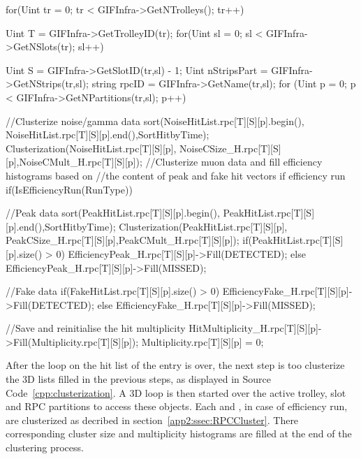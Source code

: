 	\begin{code}
	\begin{cppcode}
for(Uint tr = 0; tr < GIFInfra->GetNTrolleys(); tr++){
    Uint T = GIFInfra->GetTrolleyID(tr);
    for(Uint sl = 0; sl < GIFInfra->GetNSlots(tr); sl++){
        Uint S = GIFInfra->GetSlotID(tr,sl) - 1;
        Uint  nStripsPart   = GIFInfra->GetNStrips(tr,sl);
        string rpcID = GIFInfra->GetName(tr,sl);
        for (Uint p = 0; p < GIFInfra->GetNPartitions(tr,sl); p++){
            //Clusterize noise/gamma data
            sort(NoiseHitList.rpc[T][S][p].begin(),
                 NoiseHitList.rpc[T][S][p].end(),SortHitbyTime);
            Clusterization(NoiseHitList.rpc[T][S][p],
                         NoiseCSize_H.rpc[T][S][p],NoiseCMult_H.rpc[T][S][p]);
            //Clusterize muon data and fill efficiency histograms based on
            //the content of peak and fake hit vectors if efficiency run
            if(IsEfficiencyRun(RunType)){
                //Peak data
                sort(PeakHitList.rpc[T][S][p].begin(),
                     PeakHitList.rpc[T][S][p].end(),SortHitbyTime);
                Clusterization(PeakHitList.rpc[T][S][p],
                           PeakCSize_H.rpc[T][S][p],PeakCMult_H.rpc[T][S][p]);
                if(PeakHitList.rpc[T][S][p].size() > 0)
                    EfficiencyPeak_H.rpc[T][S][p]->Fill(DETECTED);
                else EfficiencyPeak_H.rpc[T][S][p]->Fill(MISSED);

                //Fake data
                if(FakeHitList.rpc[T][S][p].size() > 0)
                    EfficiencyFake_H.rpc[T][S][p]->Fill(DETECTED);
                else EfficiencyFake_H.rpc[T][S][p]->Fill(MISSED);
            }
            //Save and reinitialise the hit multiplicity
            HitMultiplicity_H.rpc[T][S][p]->Fill(Multiplicity.rpc[T][S][p]);
            Multiplicity.rpc[T][S][p] = 0;
        }
    }
}
	\end{cppcode}
	\label{cpp:clusterization}
	\vspace{5mm}
	\end{code}
	
	After the loop on the hit list of the entry is over, the next step is too clusterize the 3D lists filled in the previous steps, as displayed in Source Code~\ref{cpp:clusterization}. A 3D loop is then started over the active trolley, slot and RPC partitions to access these objects. Each  and , in case of efficiency run, are clusterized as decribed in section~\ref{app2:ssec:RPCCluster}. There corresponding cluster size and multiplicity histograms are filled at the end of the clustering process.
	
